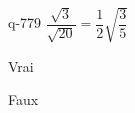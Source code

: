 \begin{truefalse}{q-779}
$\dfrac{\sqrt{3}}{\sqrt{20}}=\dfrac{1}{2}\sqrt{\dfrac{3}{5}}$
\item* Vrai
\item Faux
\end{truefalse}

